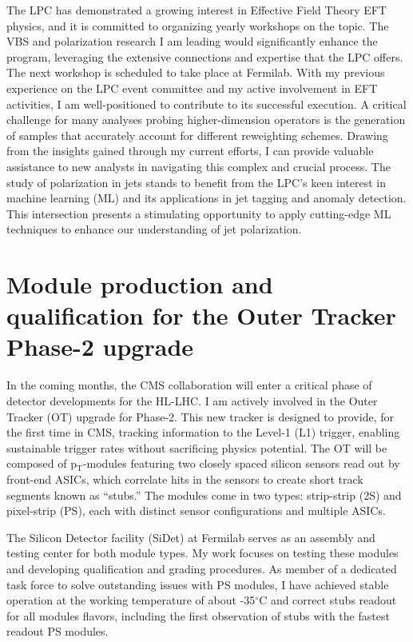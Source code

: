 {\begin{flushleft}
 
The LPC has demonstrated a growing interest in Effective Field Theory EFT physics, and it is committed to organizing yearly workshops on the topic. The VBS and polarization research I am leading would significantly enhance the program, leveraging the extensive connections and expertise that the LPC offers.
The next workshop is scheduled to take place at Fermilab. With my previous experience on the LPC event committee and my active involvement in EFT activities, I am well-positioned to contribute to its successful execution.
A critical challenge for many analyses probing higher-dimension operators is the generation of samples that accurately account for different reweighting schemes. Drawing from the insights gained through my current efforts, I can provide valuable assistance to new analysts in navigating this complex and crucial process.
The study of polarization in jets stands to benefit from the LPC's keen interest in machine learning (ML) and its applications in jet tagging and anomaly detection. This intersection presents a stimulating opportunity to apply cutting-edge ML techniques to enhance our understanding of jet polarization.

\vspace{\baselineskip}
\section{Module production and qualification for the Outer Tracker Phase-2 upgrade}
\vspace{\baselineskip}
In the coming months, the CMS collaboration will enter a critical phase of detector developments for the HL-LHC.  I am actively involved in the Outer Tracker (OT) upgrade for Phase-2. This new tracker is designed to provide, for the first time in CMS, tracking information to the Level-1 (L1) trigger, enabling sustainable trigger rates without sacrificing physics potential. The OT will be composed of p$_{\mathrm{T}}$-modules featuring two closely spaced silicon sensors read out by front-end ASICs, which correlate hits in the sensors to create short track segments known as ``stubs.'' The modules come in two types: strip-strip (2S) and pixel-strip (PS), each with distinct sensor configurations and multiple ASICs.


The Silicon Detector facility (SiDet) at Fermilab serves as an assembly and testing center for both module types. My work focuses on testing these modules and developing qualification and grading procedures. As member of a dedicated task force to solve outstanding issues with PS modules, I have achieved stable operation at the working temperature of about -35$^{\circ}$C and correct stubs readout for all modules flavors, including the first observation of stubs with the fastest readout PS modules.


\end{flushleft}}
